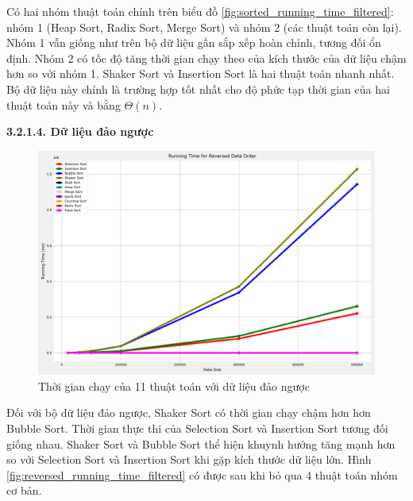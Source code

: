 Có hai nhóm thuật toán chính trên biểu đồ \ref{fig:sorted_running_time_filtered}: nhóm 1 (Heap Sort, Radix Sort, Merge Sort) và nhóm 2 (các thuật toán còn lại). Nhóm 1 vẫn giống như trên bộ dữ liệu gần sắp xếp hoàn chỉnh, tương đối ổn định. Nhóm 2 có tốc độ tăng thời gian chạy theo của kích thước của dữ liệu chậm hơn so với nhóm 1. Shaker Sort và Insertion Sort là hai thuật toán nhanh nhất. Bộ dữ liệu này chính là trường hợp tốt nhất cho độ phức tạp thời gian của hai thuật toán này và bằng $\Theta(n)$.

\textbf{3.2.1.4. Dữ liệu đảo ngược}

\begin{figure}[H]
    \centering
    \includegraphics[width=\textwidth]{experimental_result/images/reversed_running_time.png}
    \caption{Thời gian chạy của 11 thuật toán với dữ liệu đảo ngược}
    \label{fig:reversed_running_time}
\end{figure}

Đối với bộ dữ liệu đảo ngược, Shaker Sort có thời gian chạy chậm hơn hơn Bubble Sort. Thời gian thực thi của Selection Sort và Insertion Sort tương đối giống nhau. Shaker Sort và Bubble Sort thể hiện khuynh hướng tăng mạnh hơn so với Selection Sort và Insertion Sort khi gặp kích thước dữ liệu lớn. Hình \ref{fig:reversed_running_time_filtered} có được sau khi bỏ qua 4 thuật toán nhóm cơ bản.

